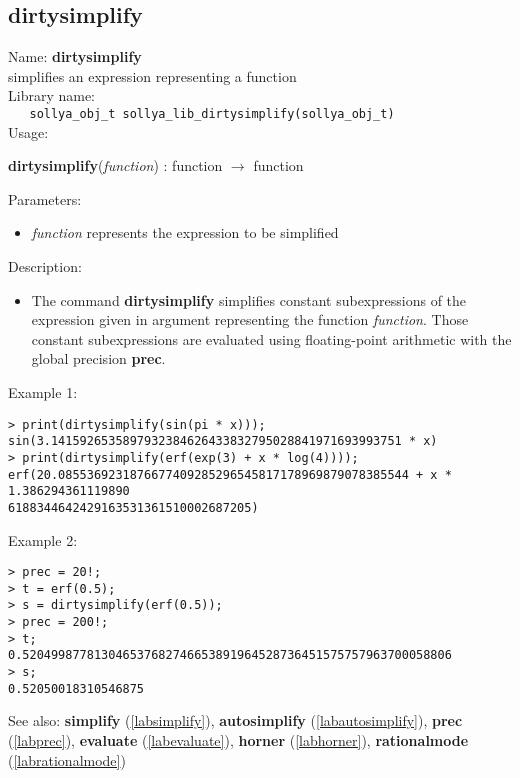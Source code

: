 \subsection{dirtysimplify}
\label{labdirtysimplify}
\noindent Name: \textbf{dirtysimplify}\\
\phantom{aaa}simplifies an expression representing a function\\[0.2cm]
\noindent Library name:\\
\verb|   sollya_obj_t sollya_lib_dirtysimplify(sollya_obj_t)|\\[0.2cm]
\noindent Usage: 
\begin{center}
\textbf{dirtysimplify}(\emph{function}) : \textsf{function} $\rightarrow$ \textsf{function}\\
\end{center}
Parameters: 
\begin{itemize}
\item \emph{function} represents the expression to be simplified
\end{itemize}
\noindent Description: \begin{itemize}

\item The command \textbf{dirtysimplify} simplifies constant subexpressions of the
   expression given in argument representing the function
   \emph{function}. Those constant subexpressions are evaluated using
   floating-point arithmetic with the global precision \textbf{prec}.
\end{itemize}
\noindent Example 1: 
\begin{center}\begin{minipage}{15cm}\begin{Verbatim}[frame=single]
> print(dirtysimplify(sin(pi * x)));
sin(3.1415926535897932384626433832795028841971693993751 * x)
> print(dirtysimplify(erf(exp(3) + x * log(4))));
erf(20.0855369231876677409285296545817178969879078385544 + x * 1.386294361119890
6188344642429163531361510002687205)
\end{Verbatim}
\end{minipage}\end{center}
\noindent Example 2: 
\begin{center}\begin{minipage}{15cm}\begin{Verbatim}[frame=single]
> prec = 20!;
> t = erf(0.5);
> s = dirtysimplify(erf(0.5));
> prec = 200!;
> t;
0.520499877813046537682746653891964528736451575757963700058806
> s;
0.52050018310546875
\end{Verbatim}
\end{minipage}\end{center}
See also: \textbf{simplify} (\ref{labsimplify}), \textbf{autosimplify} (\ref{labautosimplify}), \textbf{prec} (\ref{labprec}), \textbf{evaluate} (\ref{labevaluate}), \textbf{horner} (\ref{labhorner}), \textbf{rationalmode} (\ref{labrationalmode})
